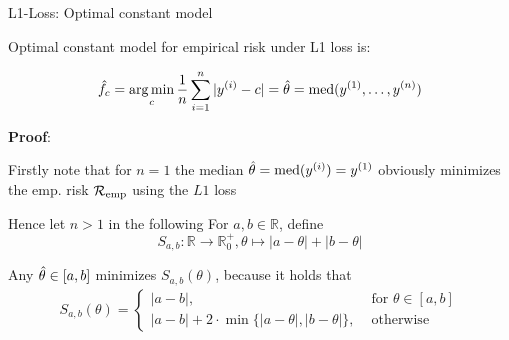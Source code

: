 \documentclass[11pt,compress,t,notes=noshow, xcolor=table]{beamer}
\begin{document}
\begin{framev}[fs=small]{L1-Loss: Optimal constant model}


Optimal constant model for empirical risk under L1 loss is:

$$\hat{f}_c = \operatorname*{arg\,min}_{c} \frac{1}{n} \sum\limits_{i=1}^n |y^{(i)} -c| =\hat{\theta} = \text{med}(y^{(1)}, \ldots, y^{(n)}) $$  

\textbf{Proof}: 

\begin{itemizeS}
\item Firstly note that for $n = 1$ the median $\hat{\theta} = \text{med}(y^{(i)}) = y^{(1)}$ obviously minimizes the emp. risk $\mathcal{R}_{\text{emp}}$ using the $L1$ loss 

\item Hence let $n > 1$ in the following For $a,b \in \mathbb{R}$, define 
$$S_{a,b}:\mathbb{R} \rightarrow \mathbb{R}^+_0, \theta \mapsto |a- \theta| + |b-\theta|$$

Any $\hat{\theta} \in [a,b]$ minimizes $S_{a,b}(\theta)$, because it holds that
{\scriptsize
\begin{align*}
S_{a,b}(\theta) = \begin{cases}|a-b| ,& \text{ for } \theta \in [a,b]\\ |a-b| + 2\cdot\min\{|a-\theta|,|b-\theta|\}
,& \text{ otherwise}\end{cases}
\end{align*}
}
\end{itemizeS}
\vspace*{-0.4cm}

\end{framev}
\end{document}
